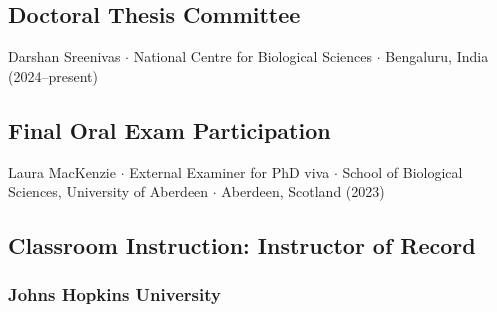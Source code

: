 \documentclass{cv}
\begin{document}
\subsection*{Doctoral Thesis Committee}

Darshan Sreenivas $\cdot$ National Centre for Biological Sciences $\cdot$ Bengaluru, India (2024--present)






\subsection*{Final Oral Exam Participation}

Laura MacKenzie $\cdot$ External Examiner for PhD viva $\cdot$ School of Biological Sciences, University of Aberdeen $\cdot$ Aberdeen, Scotland (2023)

\subsection*{Classroom Instruction: Instructor of Record}

\subsubsection*{Johns Hopkins University}
\end{document}
